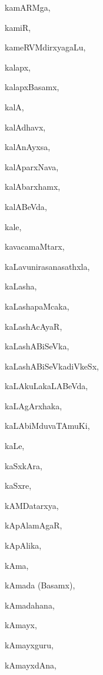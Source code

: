 \begin{multicols}{2}
{kamARMga}, \pageref{kamARMga}

{kamiR}, \pageref{kamiR}

{kameRVMdirxyagaLu}, \pageref{kameRVMdirxyagaLu}

{kalapx}, \pageref{kalapx}

{kalapxBasamx}, \pageref{kalapxBasamx}

{kalA}, \pageref{kalA}

{kalAdhavx}, \pageref{kalAdhavx}

{kalAnAyxsa}, \pageref{kalAnAyxsa}

{kalAparxNava}, \pageref{kalAparxNava}

{kalAbarxhamx}, \pageref{kalAbarxhamx}

{kalABeVda}, \pageref{kalABeVda}

{kale}, \pageref{kale}

{kavacamaMtarx}, \pageref{kavacamaMtarx}

{kaLavunirasanasathxla}, \pageref{kaLavunirasanasathxla}

{kaLasha}, \pageref{kaLasha}

{kaLashapaMcaka}, \pageref{kaLashapaMcaka}

{kaLashAcAyaR}, \pageref{kaLashAcAyaR}

{kaLashABiSeVka}, \pageref{kaLashABiSeVka}

{kaLashABiSeVkadiVkeSx}, \pageref{kaLashABiSeVkadiVkeSx}

{kaLAkuLakaLABeVda}, \pageref{kaLAkuLakaLABeVda}

{kaLAgArxhaka}, \pageref{kaLAgArxhaka}

{kaLAbiMduvaTAmuKi}, \pageref{kaLAbiMduvaTAmuKi}

{kaLe}, \pageref{kaLe}

{kaSxkAra}, \pageref{kaSxkAra}

{kaSxre}, \pageref{kaSxre}

{kAMDatarxya}, \pageref{kAMDatarxya}

{kApAlamAgaR}, \pageref{kApAlamAgaR}

{kApAlika}, \pageref{kApAlika}

{kAma}, \pageref{kAma}

{kAmada (Basamx)}, \pageref{kAmada (Basamx)}

{kAmadahana}, \pageref{kAmadahana}

{kAmayx}, \pageref{kAmayx}

{kAmayxguru}, \pageref{kAmayxguru}

{kAmayxdAna}, \pageref{kAmayxdAna}


\end{multicols}
